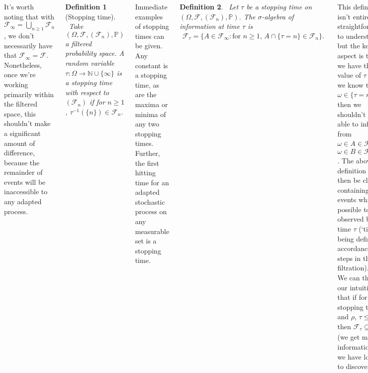 \documentclass{tikzposter} %
\newtheorem{definition}{Definition}
\begin{document}
\begin{columns}
{    It's worth noting that with $\mathcal{F}_{\infty} = \bigcup_{n \ge 1} \mathcal{F}_{n}$, we don't necessarily have that $\mathcal{F}_{\infty} = \mathcal{F}$. Nonetheless, once we're working primarily within the filtered space, this shouldn't make a significant amount of difference, because the remainder of events will be inaccessible to any adapted process. \\

    \begin{definition}[Stopping time]
    \ Take $(\Omega, \mathcal{F}, (\mathcal{F}_{n}), \mathbb{P})$ a filtered probability space. A random variable $\tau : \Omega \to \mathbb{N} \cup \{\infty\}$ is a stopping time with respect to $(\mathcal{F}_{n})$ if for $n \ge 1$, $\tau^{-1}(\{n\}) \in \mathcal{F}_{n}$.
    \end{definition}
    \hphantom{}

    Immediate examples of stopping times can be given. Any constant is a stopping time, as are the maxima or minima of any two stopping times. Further, the first hitting time for an adapted stochastic process on any measurable set is a stopping time. \\

    \begin{definition}
    \ Let $\tau$ be a stopping time on $(\Omega, \mathcal{F}, (\mathcal{F}_{n}), \mathbb{P})$. The $\sigma$-algebra of information at time $\tau$ is
    \begin{align*}
      \mathcal{F}_{\tau} = \{A \in \mathcal{F}_{\infty} : \text{for } n \ge 1,\,A \cap \{\tau = n\} \in \mathcal{F}_{n}\}.
    \end{align*}
    \end{definition}

    This definition isn't entirely straightforward to understand, but the key aspect is this: if we have the value of $\tau$ (say we know that $\omega \in \{\tau = n\}$), then we shouldn't be able to infer from $\omega \in A \in \mathcal{F}_{\tau}$ that $\omega \in B \in \mathcal{F}_{\infty} \setminus \mathcal{F}_{n}$. The above definition should then be clear as containing the events which are possible to have observed by time $\tau$ (`time' being defined in accordance to steps in the filtration).\\

    We can then get our intuition that if for stopping times $\tau$ and $\rho$, $\tau \le \rho$, then $\mathcal{F}_{\tau} \subseteq \mathcal{F}_{\rho}$ (we get more information if we have longer to discover it). \\

}
\end{columns}
\end{document}
